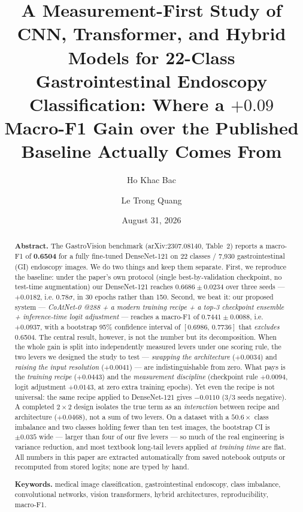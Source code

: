 \documentclass[11pt,a4paper]{article}
\title{\vspace{-1.0cm}\bfseries\Large A Measurement-First Study of CNN, Transformer,
and Hybrid Models for 22-Class Gastrointestinal Endoscopy Classification:
Where a $+0.09$ Macro-F1 Gain over the Published Baseline Actually Comes From}
\author{Ho Khac Bac}
\author{Le Trong Quang}
\affil{\normalsize AIN501 --- Artificial Intelligence (Deep Learning), MSE, FPT School of Business \& Technology}
\date{August 31, 2026}
\newcommand{\macroF}{\textup{macro-F1}}   %
\begin{document}
\maketitle

\begin{abstract}
\noindent\textbf{Abstract.}
The GastroVision benchmark (arXiv:2307.08140, Table~2) reports a \macroF{} of
\textbf{0.6504} for a fully fine-tuned DenseNet-121 on 22 classes / 7{,}930
gastrointestinal (GI) endoscopy images. We do two things and keep them
separate. First, we reproduce the baseline: under the paper's own protocol
(single best-by-validation checkpoint, no test-time augmentation) our
DenseNet-121 reaches $0.6686\pm0.0234$ over three seeds --- $+0.0182$, i.e.
$0.78\sigma$, in 30 epochs rather than 150. Second, we beat it: our proposed
system --- \emph{CoAtNet-0 @288 + a modern training recipe + a top-3 checkpoint
ensemble + inference-time logit adjustment} --- reaches a \macroF{} of
$\mathbf{0.7441\pm0.0088}$, i.e. $+0.0937$, with a bootstrap 95\% confidence
interval of $[0.6986,\,0.7736]$ that \emph{excludes} 0.6504.
The central result, however, is not the number but its decomposition. When the
whole gain is split into independently measured levers under one scoring rule,
the two levers we designed the study to test --- \emph{swapping the
architecture} ($+0.0034$) and \emph{raising the input resolution}
($+0.0041$) --- are indistinguishable from zero. What pays is the
\emph{training recipe} ($+0.0443$) and the \emph{measurement discipline}
(checkpoint rule $+0.0094$, logit adjustment $+0.0143$, at zero extra training
epochs). Yet even the recipe is not universal: the same recipe applied to
DenseNet-121 gives $-0.0110$ (3/3 seeds negative). A completed $2{\times}2$
design isolates the true term as an \emph{interaction} between recipe and
architecture ($+0.0468$), not a sum of two levers. On a dataset with a
$50.6\times$ class imbalance and two classes holding fewer than ten test
images, the bootstrap CI is $\pm0.035$ wide --- larger than four of our five
levers --- so much of the real engineering is variance reduction, and most
textbook long-tail levers applied \emph{at training time} are flat.
All numbers in this paper are extracted automatically from saved notebook
outputs or recomputed from stored logits; none are typed by hand.

\smallskip
\noindent\textbf{Keywords.} medical image classification, gastrointestinal
endoscopy, class imbalance, convolutional networks, vision transformers, hybrid
architectures, reproducibility, macro-F1.
\end{abstract}
\end{document}

